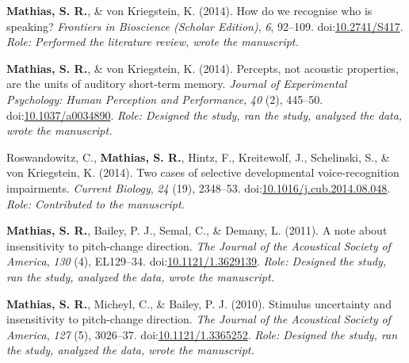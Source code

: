 \documentclass[10pt]{article}
\makeatletter
\newlength{\bibhang}
\newlength{\bibsep}
 {\@listi \global\bibsep\itemsep \global\advance\bibsep by\parsep}
\newenvironment{bibsection}%
        {\vspace{-\baselineskip}\begin{list}{}{%
       \setlength{\leftmargin}{\bibhang}%
       \setlength{\itemindent}{-\leftmargin}%
       \setlength{\itemsep}{\bibsep}%
       \setlength{\parsep}{\z@}%
        \setlength{\partopsep}{0pt}%
        \setlength{\topsep}{0pt}}}
        {\end{list}\vspace{-.6\baselineskip}}
\newcommand\doilink[1]{\href{http://dx.doi.org/#1}{#1}}
\newcommand\doi[1]{doi:\doilink{#1}}
\makeatother
\begin{document}
\begin{bibsection}
\item \textbf{Mathias, S. R.}, \& von Kriegstein, K. (2014). How do we recognise who is speaking? \emph{Frontiers in Bioscience (Scholar Edition)}, \emph{6}, 92--109. \doi{10.2741/S417}. \emph{Role: Performed the literature review, wrote the manuscript.}

\item \textbf{Mathias, S. R.}, \& von Kriegstein, K. (2014). Percepts, not acoustic properties, are the units of auditory short-term memory. \emph{Journal of Experimental Psychology: Human Perception and Performance}, \emph{40} (2), 445--50. \doi{10.1037/a0034890}. \emph{Role: Designed the study, ran the study, analyzed the data, wrote the manuscript.}

\item Roswandowitz, C., \textbf{Mathias, S. R.}, Hintz, F., Kreitewolf, J., Schelinski, S., \& von Kriegstein, K. (2014). Two cases of selective developmental voice-recognition impairments. \emph{Current Biology}, \emph{24} (19), 2348--53. \doi{10.1016/j.cub.2014.08.048}. \emph{Role: Contributed to the manuscript.}

\item \textbf{Mathias, S. R.}, Bailey, P. J., Semal, C., \& Demany, L. (2011). A note about insensitivity to pitch-change direction. \emph{The Journal of the Acoustical Society of America}, \emph{130} (4), EL129--34. \doi{10.1121/1.3629139}. \emph{Role: Designed the study, ran the study, analyzed the data, wrote the manuscript.}
    
\item \textbf{Mathias, S. R.}, Micheyl, C., \& Bailey, P. J. (2010). Stimulus uncertainty and insensitivity to pitch-change direction. \emph{The Journal of the Acoustical Society of America}, \emph{127} (5), 3026--37. \doi{10.1121/1.3365252}. \emph{Role: Designed the study, ran the study, analyzed the data, wrote the manuscript.}

\end{bibsection}
\end{document}

